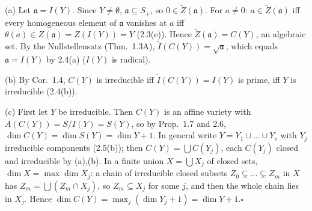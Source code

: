 \documentclass[11pt]{article}
\begin{document}
\pf
(a) Let $\mathfrak a=I(Y)$. Since $Y\ne\emptyset$, $\mathfrak a\subseteq S_+$, so $0\in\widetilde Z(\mathfrak a)$. For $a\ne0$: $a\in\widetilde Z(\mathfrak a)$ iff every homogeneous element of $\mathfrak a$ vanishes at $a$ iff $\theta(a)\in Z(\mathfrak a)=Z(I(Y))=Y$ (2.3(e)). Hence $\widetilde Z(\mathfrak a)=C(Y)$, an algebraic set. By the Nullstellensatz (Thm.~1.3A), $\widetilde I(C(Y))=\sqrt{\mathfrak a}$, which equals $\mathfrak a=I(Y)$ by 2.4(a) ($I(Y)$ is radical).

(b) By Cor.~1.4, $C(Y)$ is irreducible iff $\widetilde I(C(Y))=I(Y)$ is prime, iff $Y$ is irreducible (2.4(b)).

(c) First let $Y$ be irreducible. Then $C(Y)$ is an affine variety with $A(C(Y))=S/I(Y)=S(Y)$, so by Prop.~1.7 and 2.6, $\dim C(Y)=\dim S(Y)=\dim Y+1$. In general write $Y=Y_1\cup\dots\cup Y_s$ with $Y_j$ irreducible components (2.5(b)); then $C(Y)=\bigcup C(Y_j)$, each $C(Y_j)$ closed and irreducible by (a),(b). In a finite union $X=\bigcup X_j$ of closed sets, $\dim X=\max\dim X_j$: a chain of irreducible closed subsets $Z_0\subsetneq\dots\subsetneq Z_m$ in $X$ has $Z_m=\bigcup(Z_m\cap X_j)$, so $Z_m\subseteq X_j$ for some $j$, and then the whole chain lies in $X_j$. Hence $\dim C(Y)=\max_j(\dim Y_j+1)=\dim Y+1$.\hfill$\square$
\end{document}
